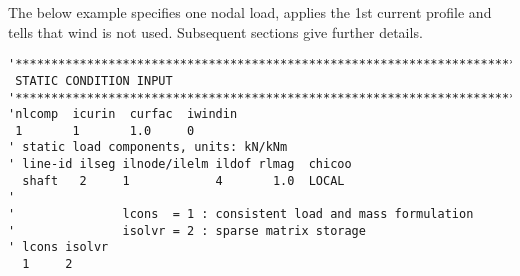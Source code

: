 The below example specifies one nodal load, applies the 1st current profile and
tells that wind is not used. Subsequent sections give further details.

\begin{lstlisting}[language=riflex, numbers=none, frame=LTRB,frameround=tttt,framesep=4pt,
                                    xleftmargin=0cm,  xrightmargin=0cm,
                                    caption={Static condition input.}]
'**********************************************************************
 STATIC CONDITION INPUT
'**********************************************************************
'nlcomp  icurin  curfac  iwindin
 1       1       1.0     0
' static load components, units: kN/kNm
' line-id ilseg ilnode/ilelm ildof rlmag  chicoo
  shaft   2     1            4       1.0  LOCAL
'
'               lcons  = 1 : consistent load and mass formulation
'               isolvr = 2 : sparse matrix storage
' lcons isolvr
  1     2
\end{lstlisting}
